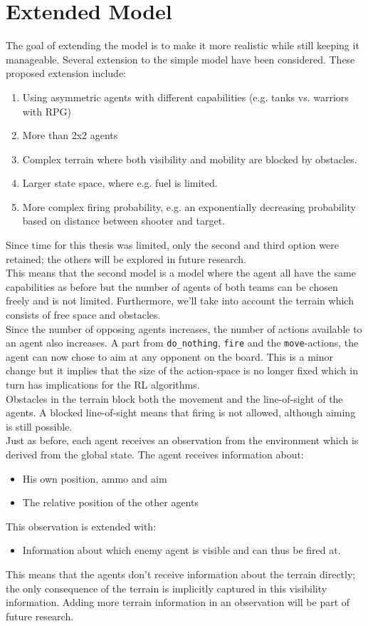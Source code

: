 \section{Extended Model}
\label{sec:extended_model}
The goal of extending the model is to make it more realistic while still keeping it manageable. Several extension to the simple model have been considered. These proposed extension include:
\begin{enumerate}
    \item Using asymmetric agents with different capabilities (e.g. tanks vs. warriors with RPG)
    \item More than 2x2 agents
    \item Complex terrain where both visibility and mobility are blocked by obstacles.
    \item Larger state space, where e.g. fuel is limited.
    \item More complex firing probability, e.g. an exponentially decreasing probability based on distance between shooter and target.
\end{enumerate}
Since time for this thesis was limited, only the second and third option were retained; the others will be explored in future research.\\
This means that the second model is a model where the agent all have the same capabilities as before but the number of agents of both teams can be chosen freely and is not limited. Furthermore, we'll take into account the terrain which consists of free space and obstacles.\\
Since the number of opposing agents increases, the number of actions available to an agent also increases. A part from {\tt do\_nothing}, {\tt fire} and the {\tt move}-actions, the agent can now chose to aim at any opponent on the board. This is a minor change but it implies that the size of the action-space is no longer fixed which in turn has implications for the RL algorithms.\\
Obstacles in the terrain block both the movement and the line-of-sight of the agents. A blocked line-of-sight means that firing is not allowed, although aiming is still possible.\\
Just as before, each agent receives an observation from the environment which is derived from the global state. The agent receives information about:
\begin{itemize}
    \item His own position, ammo and aim
    \item The relative position of the other agents
\end{itemize}
This observation is extended with:
\begin{itemize}
    \item Information about which enemy agent is visible and can thus be fired at. 
\end{itemize}
This means that the agents don't receive information about the terrain directly; the only consequence of the terrain is implicitly captured in this visibility information. Adding more terrain information in an observation will be part of future research.
\\

